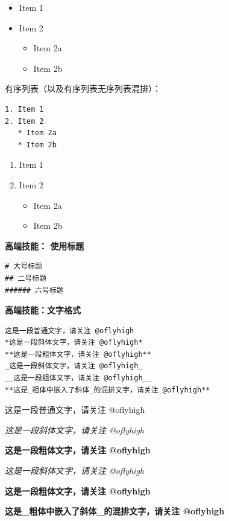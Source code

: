 \documentclass[]{ctexbook}
\providecommand{\tightlist}{%
  \setlength{\itemsep}{0pt}\setlength{\parskip}{0pt}}
\begin{document}
\begin{itemize}
\tightlist
\item
  Item 1
\item
  Item 2

  \begin{itemize}
  \tightlist
  \item
    Item 2a
  \item
    Item 2b
  \end{itemize}
\end{itemize}

有序列表（以及有序列表无序列表混排）：

\begin{verbatim}
1. Item 1
2. Item 2
   * Item 2a
   * Item 2b
\end{verbatim}

\begin{enumerate}
\def\labelenumi{\arabic{enumi}.}
\tightlist
\item
  Item 1
\item
  Item 2

  \begin{itemize}
  \tightlist
  \item
    Item 2a
  \item
    Item 2b
  \end{itemize}
\end{enumerate}

\textbf{高端技能： 使用标题}

\begin{verbatim}
# 大号标题
## 二号标题
###### 六号标题
\end{verbatim}

\textbf{高端技能：文字格式}

\begin{verbatim}
这是一段普通文字，请关注 @oflyhigh
*这是一段斜体文字，请关注 @oflyhigh*
**这是一段粗体文字，请关注 @oflyhigh**
_这是一段斜体文字，请关注 @oflyhigh_
__这是一段粗体文字，请关注 @oflyhigh__
**这是_粗体中嵌入了斜体_的混排文字，请关注 @oflyhigh**
\end{verbatim}

这是一段普通文字，请关注 @oflyhigh

\emph{这是一段斜体文字，请关注 @oflyhigh}

\textbf{这是一段粗体文字，请关注 @oflyhigh}

\emph{这是一段斜体文字，请关注 @oflyhigh}

\textbf{这是一段粗体文字，请关注 @oflyhigh}

\textbf{这是\_粗体中嵌入了斜体\_的混排文字，请关注 @oflyhigh}
\end{document}
